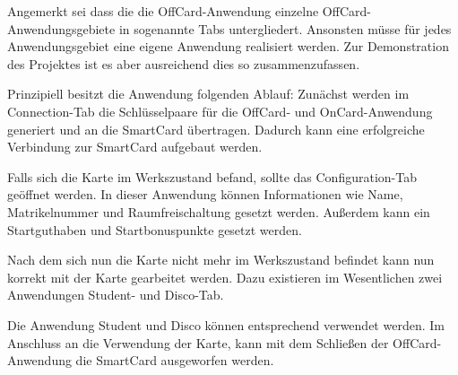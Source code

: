 Angemerkt sei dass die die OffCard-Anwendung einzelne OffCard-Anwendungsgebiete in sogenannte Tabs untergliedert.
Ansonsten müsse für jedes Anwendungsgebiet eine eigene Anwendung realisiert werden.
Zur Demonstration des Projektes ist es aber ausreichend dies so zusammenzufassen.

Prinzipiell besitzt die Anwendung folgenden Ablauf:
Zunächst werden im Connection-Tab die Schlüsselpaare für die OffCard- und OnCard-Anwendung generiert und an die SmartCard übertragen.
Dadurch kann eine erfolgreiche Verbindung zur SmartCard aufgebaut werden.

Falls sich die Karte im Werkszustand befand, sollte das Configuration-Tab geöffnet werden.
In dieser Anwendung können Informationen wie Name, Matrikelnummer und Raumfreischaltung gesetzt werden.
Außerdem kann ein Startguthaben und Startbonuspunkte gesetzt werden.

Nach dem sich nun die Karte nicht mehr im Werkszustand befindet kann nun korrekt mit der Karte gearbeitet werden.
Dazu existieren im Wesentlichen zwei Anwendungen Student- und Disco-Tab.

Die Anwendung Student und Disco können entsprechend verwendet werden. 
Im Anschluss an die Verwendung der Karte, kann mit dem Schließen der OffCard-Anwendung die SmartCard ausgeworfen werden.

%

